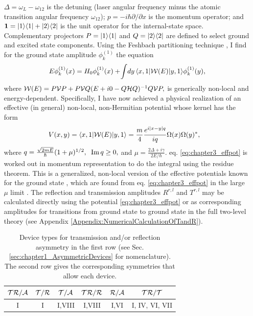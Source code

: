 $\Delta=\omega_{L}-\omega_{12}$
is the detuning (laser angular frequency minus the atomic transition
angular frequency $\omega_{12}$);
${p}=-i\hbar\partial/\partial x$ is the momentum operator;
and ${\bf 1}=|1\rangle\langle 1|+|2\rangle\langle 2|$ is the unit operator
for the internal-state space.
Complementary projectors
%
$P=|1\rangle\langle 1|$ and $Q=|2\rangle\langle 2|$
%
are defined to select ground and excited state components.
Using the Feshbach partitioning
technique \cite{Feshbach1958,Feshbach1962,Levine1969},
I find for the ground
state amplitude $\phi_k^{(1)}$ the equation
%
\begin{equation}\label{effecti}
  E\phi_k^{(1)}(x) = H_0\phi_k^{(1)}(x)+\!
  \int\! dy\, \la x,1|{\cal W}(E)|y,1\ra \phi_k^{(1)}(y),
\end{equation}
%
where
%
$
{\cal W}(E)=P{\cal V}P+P{\cal V}Q(E+i0-Q{\cal H}Q)^{-1}Q{\cal V}P,
$
%
is generically non-local and energy-dependent. Specifically, I have now achieved
a physical realization of an effective (in general) non-local, non-Hermitian potential whose kernel has the form
%
\begin{eqnarray}
  \hspace*{-.3cm}V (x,y) = \la x,1|{\cal W}(E)|y,1\ra = \frac{m}{4} \frac{e^{i|x-y|q}}{i q}
  \Omega(x)\Omega(y)^*,
  \label{eq:chapter3_effpot}
\end{eqnarray}
%
%
where
$
q=\frac{\sqrt{2mE}}{\hbar}(1+\mu)^{1/2},\;\;
{\rm Im}\,q\ge 0,
\label{qeq}
$ and
$
\mu=\frac{2\Delta+i\gamma}{2E/\hbar}.
$
%
eq. \eqref{eq:chapter3_effpot} is worked out  in momentum representation to do the integral
using the residue theorem.
This is a generalized, non-local version of the effective potentials known for the ground state
\cite{Chudesnikov1991,Oberthaler1996}, which are found from eq. \eqref{eq:chapter3_effpot}  in the large $\mu$ limit \cite{Ruschhaupt2004a}.
The reflection and transmission amplitudes $R^{r,l}$ and  $T^{r,l}$ may be calculated directly
using the potential \eqref{eq:chapter3_effpot} or as corresponding amplitudes for
transitions from ground state to ground state in the full two-level theory (see Appendix \ref{Appendix:NumericalCalculationOfTandR}).

\begin{table}
  \caption{Device types for  transmission and/or reflection asymmetry in the first row (see Sec. \ref{sec:chapter1_AsymmetricDevices} for nomenclature).
  The second row gives the corresponding symmetries  that allow
  each device.
  \label{devices}}
  \vspace*{.0cm}
  \label{tab:chapter3_table2PhysicalImplementation}
  \centering
  \begin{tabular}{cccccc}
    \hline\hline
    $\cal{TR/A}$ & $\cal{T/R}$ & $\cal{T/A}$ & $\cal{TR/R}$ & $\cal{R/A}$ & $\cal{TR/T}$ \\
    \hline
    I            & I           & I,VIII      & I,VIII       & I,VI        & I, IV, VI, VII
    \\
    \hline\hline
  \end{tabular}
\end{table}
%

